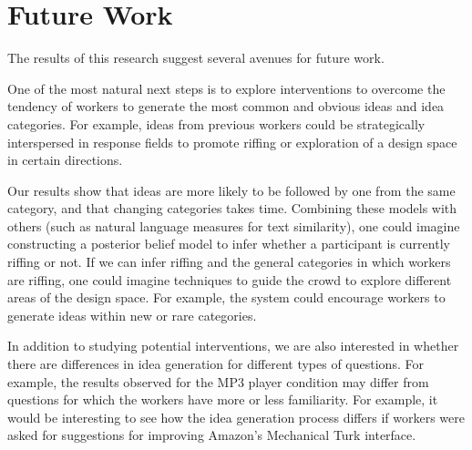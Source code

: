 \section{Future Work}

The results of this research suggest several avenues for future work.

One of the most natural next steps is to explore interventions to overcome the tendency of workers to generate the most common and obvious ideas and idea categories. For example, ideas from previous workers could be strategically interspersed in response fields to promote riffing or exploration of a design space in certain directions. 

Our results show that ideas are more likely to be followed by one from the same category, and that changing categories takes time. Combining these models with others (such as natural language measures for text similarity), one could imagine constructing a posterior belief model to infer whether a participant is currently riffing or not. If we can infer riffing and the general categories in which workers are riffing, one could imagine techniques to guide the crowd to explore different areas of the design space. For example, the system could encourage workers to generate ideas within new or rare categories.

In addition to studying potential interventions, we are also interested in whether there are differences in idea generation for different types of questions. For example, the results observed for the MP3 player condition may differ from questions for which the workers have more or less familiarity. For example, it would be interesting to see how the idea generation process differs if workers were asked for suggestions for improving Amazon's Mechanical Turk interface.







